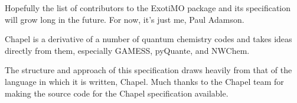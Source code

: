 \label{Acknowledgments}

Hopefully the list of contributors to the ExotiMO package and
its specification will grow long in
the future. For now, it's just me, Paul Adamson.

Chapel is a derivative of a number of quantum chemistry codes
and takes ideas directly from them, especially GAMESS, pyQuante,
and NWChem.

The structure and approach of this specification draws heavily from that of the 
language in which it is written, Chapel. Much thanks to the Chapel team
for making the source code for the Chapel specification available.
